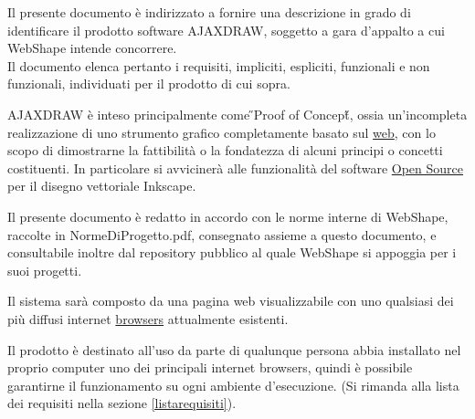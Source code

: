 \begin{center}
\begin{table}[h]
\begin{tabular*}
		\hline %
		\end{tabular*}
	\caption{Registro delle modifiche} %
	\label{tab:modifiche}
	\end{table}
\end{center}

\newpage
\thispagestyle{fancy}
\tableofcontents
\thispagestyle{fancy}
\newpage
\parskip=-5pt


Il presente documento \`e indirizzato a fornire una descrizione in grado di identificare il prodotto software AJAXDRAW, soggetto a gara d'appalto a cui WebShape intende concorrere.\\
Il documento elenca pertanto i requisiti, impliciti, espliciti, funzionali e non funzionali, individuati per il prodotto di cui sopra.

AJAXDRAW \`e inteso principalmente come \H{}Proof of Concept\H{}, ossia un'incompleta realizzazione di uno strumento grafico completamente basato sul {\underline{web}}, con lo scopo di dimostrarne la fattibilit\`a o la fondatezza di alcuni principi o concetti costituenti. In particolare si avviciner\` a alle funzionalit\`a  del software \underline{Open Source} per il disegno vettoriale Inkscape.

Il presente documento \`e redatto in accordo con le norme interne di WebShape, raccolte in NormeDiProgetto.pdf, consegnato assieme a questo documento, e consultabile inoltre dal repository pubblico al quale WebShape si appoggia per i suoi progetti.



Il sistema sar\`a composto da una pagina web visualizzabile con uno qualsiasi dei pi\`u diffusi internet {\underline{browsers}} attualmente esistenti.

Il prodotto \`e destinato all'uso da parte di qualunque persona abbia installato nel proprio computer uno dei principali internet browsers, quindi \`e possibile garantirne il funzionamento su ogni ambiente d'esecuzione. (Si rimanda alla lista dei requisiti nella sezione \ref{listarequisiti}).

